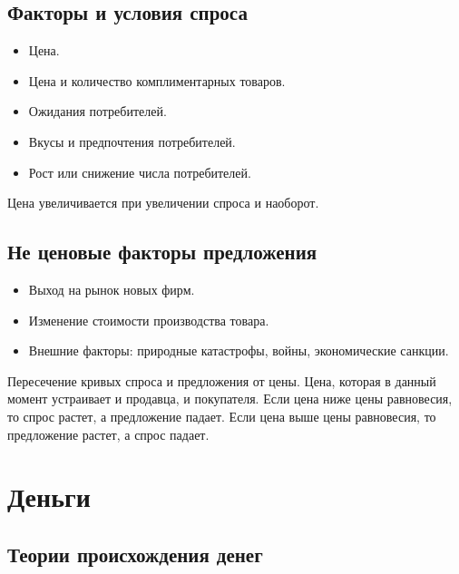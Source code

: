 \documentclass[12pt]{article}
\begin{document}
	\subsection{Факторы и условия спроса}
	
	\begin{itemize}
		\item Цена.
		\item Цена и количество комплиментарных товаров.
		\item Ожидания потребителей.
		\item Вкусы и предпочтения потребителей.
		\item Рост или снижение числа потребителей.
	\end{itemize}
	
	\begin{definition} 
		Цена увеличивается при увеличении спроса и наоборот.
	\end{definition}
	
	\subsection{Не ценовые факторы предложения}
	
	\begin{itemize}
		\item Выход на рынок новых фирм.
		\item Изменение стоимости производства товара.
		\item Внешние факторы: природные катастрофы, войны, экономические санкции.
	\end{itemize}
	
	\begin{definition}
		Пересечение кривых спроса и предложения от цены. Цена, которая в данный момент устраивает и продавца, и покупателя. Если цена ниже цены равновесия, то спрос растет, а предложение падает. Если цена выше цены равновесия, то предложение растет, а спрос падает.
	\end{definition}
	
	\section{Деньги}
	
	\subsection{Теории происхождения денег}
	
\end{document}
